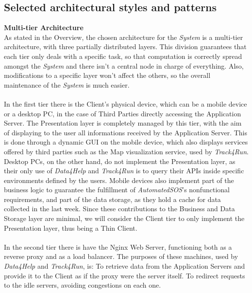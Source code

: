 \documentclass[titlepage]{article}
\begin{document}
\vspace{\baselineskip}

\pagebreak



\subsection{Selected architectural styles and patterns}

{\bf Multi-tier Architecture }\\ 
As stated in the Overview, the chosen architecture for the {\it System} is a multi-tier architecture, with three partially distributed layers. This division guarantees that each tier only deals with a specific task, so that computation is correctly spread amongst the {\it System} and there isn’t a central node in charge of everything. Also, modifications to a specific layer won’t affect the others, so the overall maintenance of the {\it System} is much easier.\\ \\
In the first tier there is the Client’s physical device, which can be a mobile device or a desktop PC, in the case of Third Parties directly accessing the Application Server.
The Presentation layer is completely managed by this tier, with the aim of displaying to the user all informations received by the Application Server. This is done through a dynamic GUI on the mobile device, which also displays services offered by third parties such as the Map visualization service, used by {\it Track4Run}. Desktop PCs, on the other hand, do not implement the Presentation layer, as their only use of {\it Data4Help} and {\it Track4Run} is to query their APIs inside specific environments defined by the users.
Mobile devices also implement part of the business logic to guarantee the fulfillment of {\it AutomatedSOS}'s nonfunctional requirements, and part of the data storage, as they hold a cache for data collected in the last week. Since these contributions to the Business and Data Storage layer are minimal, we will consider the Client tier to only implement the Presentation layer, thus being a Thin Client.\\ \\
In the second tier there is have the Nginx Web Server, functioning both as a reverse proxy and as a load balancer. The purposes of these machines, used by {\it Data4Help} and {\it Track4Run}, is:
To retrieve data from the Application Servers and provide it to the Client as if the proxy were the server itself.
To redirect requests to the idle servers, avoiding congestions on each one.
\end{document}
